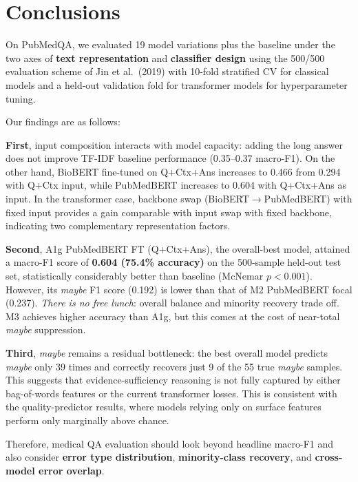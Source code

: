 \documentclass[11pt]{article}
\begin{document}
\section{Conclusions}

On PubMedQA, we evaluated 19 model variations plus the baseline under the two axes of \textbf{text representation} and \textbf{classifier design} using the 500/500 evaluation scheme of Jin et al.\ (2019) with 10-fold stratified CV for classical models and a held-out validation fold for transformer models for hyperparameter tuning.

Our findings are as follows:

\textbf{First}, input composition interacts with model capacity: adding the long answer does not improve TF-IDF baseline performance (0.35--0.37 macro-F1). On the other hand, BioBERT fine-tuned on Q+Ctx+Ans increases to 0.466 from 0.294 with Q+Ctx input, while PubMedBERT increases to 0.604 with Q+Ctx+Ans as input. In the transformer case, backbone swap (BioBERT$\to$PubMedBERT) with fixed input provides a gain comparable with input swap with fixed backbone, indicating two complementary representation factors.

\textbf{Second}, A1g PubMedBERT FT (Q+Ctx+Ans), the overall-best model, attained a macro-F1 score of \textbf{0.604 (75.4\% accuracy)} on the 500-sample held-out test set, statistically considerably better than baseline (McNemar $p{<}0.001$). However, its \textit{maybe} F1 score (0.192) is lower than that of M2 PubMedBERT focal (0.237). \emph{There is no free lunch}: overall balance and minority recovery trade off. M3 achieves higher accuracy than A1g, but this comes at the cost of near-total \textit{maybe} suppression.

\textbf{Third}, \textit{maybe} remains a residual bottleneck: the best overall model predicts \textit{maybe} only 39 times and correctly recovers just 9 of the 55 true \textit{maybe} samples. This suggests that evidence-sufficiency reasoning is not fully captured by either bag-of-words features or the current transformer losses. This is consistent with the quality-predictor results, where models relying only on surface features perform only marginally above chance.

Therefore, medical QA evaluation should look beyond headline macro-F1 and also consider \textbf{error type distribution}, \textbf{minority-class recovery}, and \textbf{cross-model error overlap}.
\end{document}
